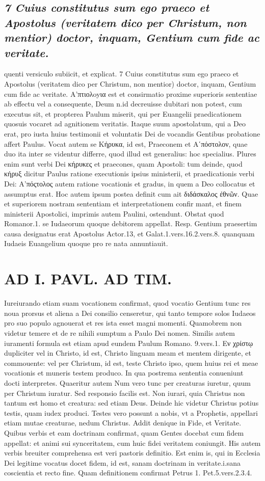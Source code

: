 \documentclass{article}
\begin{document}
\begin{pages}
\subsection*{\textit{7 Cuius constitutus sum ego praeco et Apostolus (veritatem dico per Christum, non mentior) doctor, inquam, Gentium cum fide ac veritate.}}quenti versiculo subiicit, et explicat. 7 Cuius constitutus sum ego praeco et Apostolus (veritatem dico per Christum, non mentior) doctor, inquam, Gentium  cum fide ac veritate. Α’πτιολoyια est et consirmatio proxime superioris sententiae ab effectu vel a consequente, Deum n.id decreuisse dubitari non potest, cum executus sit, et propterea Paulum miserit, qui per Euangelii praedicationem quosuis vocaret ad agnitionem veritatis. Itaque suum apostolatum, qui a Deo erat, pro iusta huius testimonii et voluntatis Dei de vocandis Gentibus probatione affert Paulus. Vocat autem se Κήρυκα, id est, Praeconem et Aʹπόστολον, quae duo ita inter se videntur differre, quod illud est generalius: hoc specialius. Plures enim sunt verbi Dei κήρυκες et praecones, quam Apostoli: tum deinde, quod κήρυξ dicitur Paulus ratione executionis ipsius ministerii, et praedicationis verbi Dei: Α’πόςτολος autem ratione vocationis et gradus, in quem a Deo collocatus et assumptus erat. Hoc autem ipsum postea definit cum ait διδάσκαλος ἐθνῶν. Quae et superiorem nostram sententiam et interpretationem confir mant, et finem ministerii Apostolici, imprimis autem Paulini, ostendunt. Obstat quod Romanor.1. se Iudaeorum quoque debitorem appellat. Resp. Gentium praesertim causa designatus erat Apostolus Actor.13, et Galat.1.vers.16.2.vers.8. quanquam Iudaeis Euangelium quoque pro re nata annuntiauit.  \pend
\section*{AD I. PAVL. AD TIM. }
\marginpar{[ p.64 ]}\pstart Iureiurando etiam suam vocationem confirmat, quod vocatio Gentium tunc res noua prorsus et aliena a Dei consilio censeretur, qui tanto tempore solos Iudaeos pro suo populo agnouerat et res ista esset magni momenti. Quamobrem non videtur temere et de re nihili sumptum a Paulo Dei nomen. Similis autem iuramenti formula est etiam apud eundem Paulum Romano. 9.vers.1. Εν χρίστῳ dupliciter vel in Christo, id est, Christo linguam meam et mentem dirigente, et commouente: vel per Christum, id est, teste Christo ipso, quem huius rei et meae vocationis et muneris testem produco. In qua postrema sententia conueniunt docti interpretes. Quaeritur autem Num vero tunc per creaturas iuretur, quum per Christum iuratur. Sed responsio facilis est. Non iurari, quia Christus non tantum est homo et creatura: sed etiam Deus. Deinde hic videtur Christus potius testis, quam iudex produci. Testes vero possunt a nobis, vt a Prophetis, appellari etiam mutae creaturae, nedum Christus. Addit denique in Fide, et Veritate. Quibus verbis et eam doctrinam confirmat, quam Gentes docebat cum fidem appellat: et animi sui synceritatem, cum huic fidei veritatem coniungit. His autem verbis breuiter comprehensa est veri pastoris definitio. Est enim is, qui in Ecclesia Dei legitime vocatus docet fidem, id est, sanam doctrinam in veritate.i.sana coscientia et recto fine. Quam definitionem confirmat Petrus 1. Pet.5.vers.2.3.4.  \pend

\end{pages}
\end{document}
